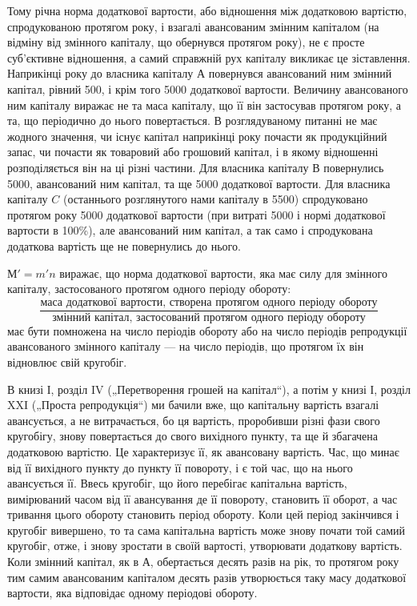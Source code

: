 Тому річна норма додаткової вартости, або відношення між додатковою
вартістю, спродукованою протягом року, і взагалі авансованим
змінним капіталом (на відміну від змінного капіталу, що обернувся
протягом року), не є просте суб’єктивне відношення, а самий
справжній рух капіталу викликає це зіставлення. Наприкінці року до
власника капіталу $А$ повернувся авансований ним змінний капітал, рівний
500, і крім того 5000 додаткової вартости. Величину
авансованого ним капіталу виражає не та маса капіталу, що її він застосував
протягом року, а та, що періодично до нього повертається. В
розглядуваному питанні не має жодного значення, чи існує капітал наприкінці
року почасти як продукційний запас, чи почасти як товаровий
або грошовий капітал, і в якому відношенні розподіляється він на ці
різні частини. Для власника капіталу В повернулись 5000, авансований
ним капітал, та ще 5000 додаткової вартости. Для власника
капіталу $C$ (останнього розглянутого нами капіталу в 5500)
спродуковано протягом року 5000 додаткової вартости (при витраті
5000 і нормі додаткової вартости в 100\%), але авансований
ним капітал, а так само і спродукована додаткова вартість ще не повернулись
до нього.

$М' = m'n$ виражає, що норма додаткової вартости, яка має силу
для змінного капіталу, застосованого протягом одного періоду обороту:\[
\frac{\text{маса додаткової вартости, створена протягом одного періоду обороту}}{\text{змінний капітал, застосований протягом одного періоду обороту}}
\]
має бути помножена на число періодів обороту або на число періодів
репродукції авансованого змінного капіталу — на число періодів, що протягом
їх він відновлює свій кругобіг.

В книзі І, розділ IV („Перетворення грошей на капітал“), а потім у
книзі І, розділ XXI („Проста репродукція“) ми бачили вже, що капітальну
вартість взагалі авансується, а не витрачається, бо ця вартість,
проробивши різні фази свого кругобігу, знову повертається до свого
вихідного пункту, та ще й збагачена додатковою вартістю. Це характеризує
її, як авансовану вартість. Час, що минає від її вихідного пункту
до пункту її повороту, і є той час, що на нього авансується її. Ввесь
кругобіг, що його перебігає капітальна вартість, вимірюваний часом від її
авансування де її повороту, становить її оборот, а час тривання цього обороту
становить період обороту. Коли цей період закінчився і кругобіг
вивершено, то та сама капітальна вартість може знову почати той самий
кругобіг, отже, і знову зростати в своїй вартості, утворювати додаткову
вартість. Коли змінний капітал, як в $А$, обертається десять разів на рік,
то протягом року тим самим авансованим капіталом десять разів утворюється
таку масу додаткової вартости, яка відповідає одному періодові
обороту.

